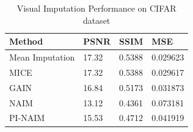 \begin{table}[htbp]
\centering
\begin{tabular}{l l l l}
\hline
Method & PSNR & SSIM & MSE \\
\hline
Mean Imputation & 17.32 & 0.5388 & 0.029623 \\
MICE & 17.32 & 0.5388 & 0.029617 \\
GAIN & 16.84 & 0.5173 & 0.031873 \\
NAIM & 13.12 & 0.4361 & 0.073181 \\
PI-NAIM & 15.53 & 0.4712 & 0.041919 \\
\hline
\end{tabular}
\caption{Visual Imputation Performance on CIFAR dataset}
\label{tab:imputation_results}
\end{table}
